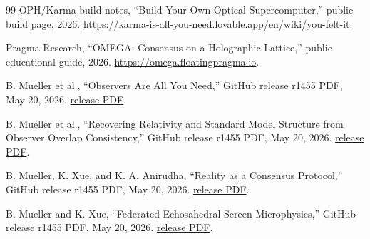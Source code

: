 \documentclass[11pt]{article}
\theoremstyle{definition}
\theoremstyle{remark}
\newcommand{\OPHPaperReleaseID}{r1455}
\newcommand{\OPHPaperReleaseDate}{May 20, 2026}
\begin{document}
\begin{thebibliography}{99}
OPH/Karma build notes,
``Build Your Own Optical Supercomputer,''
public build page, 2026.
\url{https://karma-is-all-you-need.lovable.app/en/wiki/you-felt-it}.

Pragma Research,
``OMEGA: Consensus on a Holographic Lattice,''
public educational guide, 2026.
\url{https://omega.floatingpragma.io}.

B. Mueller et al.,
``Observers Are All You Need,''
GitHub release \OPHPaperReleaseID{} PDF, \OPHPaperReleaseDate.
\href{https://github.com/FloatingPragma/observer-patch-holography/releases/download/\OPHPaperReleaseID/observers_are_all_you_need.pdf}{release PDF}.

B. Mueller et al.,
``Recovering Relativity and Standard Model Structure from Observer Overlap
Consistency,''
GitHub release \OPHPaperReleaseID{} PDF, \OPHPaperReleaseDate.
\href{https://github.com/FloatingPragma/observer-patch-holography/releases/download/\OPHPaperReleaseID/recovering_relativity_and_standard_model_structure_from_observer_overlap_consistency_compact.pdf}{release PDF}.

B. Mueller, K. Xue, and K. A. Anirudha,
``Reality as a Consensus Protocol,''
GitHub release \OPHPaperReleaseID{} PDF, \OPHPaperReleaseDate.
\href{https://github.com/FloatingPragma/observer-patch-holography/releases/download/\OPHPaperReleaseID/reality_as_consensus_protocol.pdf}{release PDF}.

B. Mueller and K. Xue,
``Federated Echosahedral Screen Microphysics,''
GitHub release \OPHPaperReleaseID{} PDF, \OPHPaperReleaseDate.
\href{https://github.com/FloatingPragma/observer-patch-holography/releases/download/\OPHPaperReleaseID/screen_microphysics_and_observer_synchronization.pdf}{release PDF}.

\end{thebibliography}
\end{document}
